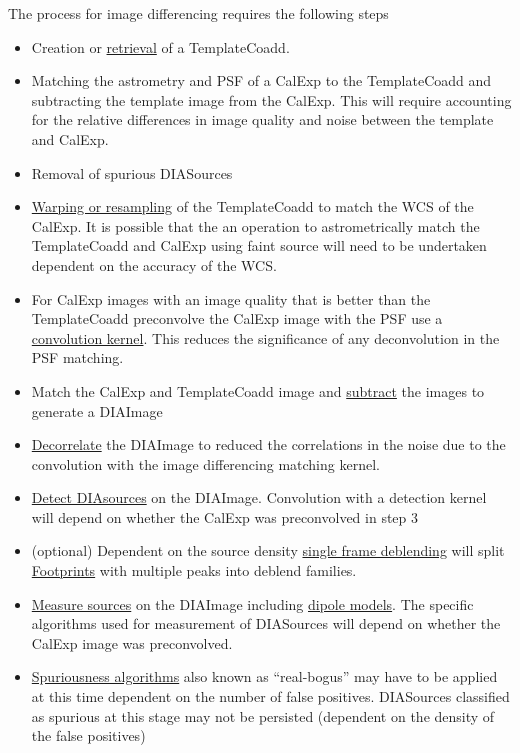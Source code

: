 The process for image differencing requires the following steps
\begin{itemize}
\item Creation or \hyperref[sec:acRetrieveTemplate]{retrieval} of a TemplateCoadd.
\item Matching the astrometry and PSF of a CalExp to the TemplateCoadd and subtracting the template image from the CalExp. This will require accounting for the relative differences in image quality and noise between the template and CalExp.
\item Removal of spurious DIASources 


\item \hyperref[sec:acWarping]{Warping or resampling} of the TemplateCoadd to match the WCS of the CalExp. It is possible that the an operation to astrometrically match the TemplateCoadd and CalExp using faint source will need to be undertaken dependent on the accuracy of the WCS.
\item For CalExp images with an image quality that is better than the TemplateCoadd preconvolve the CalExp image with the PSF use a  \hyperref[sec:spKernels]{convolution kernel}. This reduces the significance of any deconvolution in the PSF matching.
\item Match the CalExp and TemplateCoadd image and  \hyperref[sec:acImageSubtraction]{subtract} the images to generate a DIAImage
\item \hyperref[sec:acDiffImDecorrelation]{Decorrelate} the DIAImage to reduced the correlations in the noise due to the convolution with the image differencing matching kernel. 
\item \hyperref[sec:acSourceDetection]{Detect DIAsources} on the DIAImage. Convolution with a detection kernel will depend on whether the CalExp was preconvolved in step 3
\item (optional) Dependent on the source density \hyperref[sec:acSingleFrameDeblending]{single frame deblending} will split \hyperref[sec:spFootprints]{Footprints} with multiple peaks into deblend families.
\item \hyperref[sec:acDiffImMeasurement]{ Measure sources} on the DIAImage including \hyperref[sec:acDipoleModels]{dipole models}. The specific algorithms used for measurement of DIASources will depend on whether the CalExp image was preconvolved.
\item \hyperref[sec:acSpuriousnessAlgorithms]{Spuriousness algorithms} also known as ``real-bogus'' may have to be applied at this time dependent on the number of false positives. DIASources classified as spurious at this stage may not be persisted (dependent on the density of the false positives)

\end{itemize}
